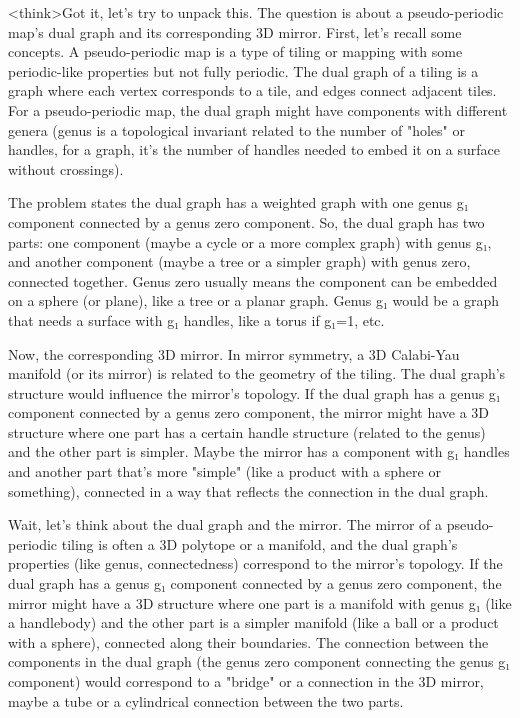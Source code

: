 <think>Got it, let's try to unpack this. The question is about a pseudo-periodic map's dual graph and its corresponding 3D mirror. First, let's recall some concepts. A pseudo-periodic map is a type of tiling or mapping with some periodic-like properties but not fully periodic. The dual graph of a tiling is a graph where each vertex corresponds to a tile, and edges connect adjacent tiles. For a pseudo-periodic map, the dual graph might have components with different genera (genus is a topological invariant related to the number of "holes" or handles, for a graph, it's the number of handles needed to embed it on a surface without crossings).

The problem states the dual graph has a weighted graph with one genus g₁ component connected by a genus zero component. So, the dual graph has two parts: one component (maybe a cycle or a more complex graph) with genus g₁, and another component (maybe a tree or a simpler graph) with genus zero, connected together. Genus zero usually means the component can be embedded on a sphere (or plane), like a tree or a planar graph. Genus g₁ would be a graph that needs a surface with g₁ handles, like a torus if g₁=1, etc.

Now, the corresponding 3D mirror. In mirror symmetry, a 3D Calabi-Yau manifold (or its mirror) is related to the geometry of the tiling. The dual graph's structure would influence the mirror's topology. If the dual graph has a genus g₁ component connected by a genus zero component, the mirror might have a 3D structure where one part has a certain handle structure (related to the genus) and the other part is simpler. Maybe the mirror has a component with g₁ handles and another part that's more "simple" (like a product with a sphere or something), connected in a way that reflects the connection in the dual graph.

Wait, let's think about the dual graph and the mirror. The mirror of a pseudo-periodic tiling is often a 3D polytope or a manifold, and the dual graph's properties (like genus, connectedness) correspond to the mirror's topology. If the dual graph has a genus g₁ component connected by a genus zero component, the mirror might have a 3D structure where one part is a manifold with genus g₁ (like a handlebody) and the other part is a simpler manifold (like a ball or a product with a sphere), connected along their boundaries. The connection between the components in the dual graph (the genus zero component connecting the genus g₁ component) would correspond to a "bridge" or a connection in the 3D mirror, maybe a tube or a cylindrical connection between the two parts.

